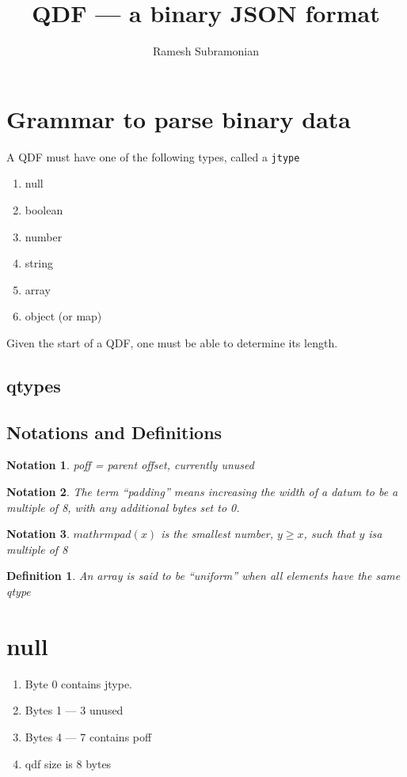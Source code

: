 \documentclass[letterpaper,12pt]{article}
\newcommand{\TBC}{\framebox{\textbf{TO BE COMPLETED}}}
\newcommand{\be}{\begin{enumerate}}
\newcommand{\ee}{\end{enumerate}}
\newtheorem{notation}{Notation}
\newtheorem{definition}{Definition}
\begin{document}
\title{QDF --- a binary JSON format}
\author{Ramesh Subramonian }
\maketitle
\thispagestyle{fancy}
\lhead{}
\chead{}
\rhead{}
\cfoot{}
\rfoot{{\small \thepage}}


\section{Grammar to parse binary data}

A QDF must have one of the following types, called a {\tt jtype}
\be
\item null
\item boolean
\item number
\item string
\item array
\item object (or map)
  \ee

Given the start of a QDF, one must be able to determine its length.
\subsection{qtypes}
\label{qtypes}


\subsection{Notations and Definitions}
\begin{notation}
poff = parent offset, currently unused \TBC
\end{notation}

\begin{notation}
The term ``padding'' means increasing the width of a datum to be a multiple of 8,
  with any additional bytes set to 0.
\end{notation}
\begin{notation}
  \(mathrm{pad}(x)\) is the smallest number, \(y \geq x\), such that \(y\) isa
  multiple of 8
\end{notation}
\begin{definition}
An array is said to be ``uniform'' when all elements have the same qtype
\end{definition}

\section{null}
\be
\item Byte 0   contains jtype.
\item Bytes 1 --- 3  unused
\item Bytes 4 --- 7  contains poff
\item qdf size is 8 bytes 
  \ee
\end{document}

